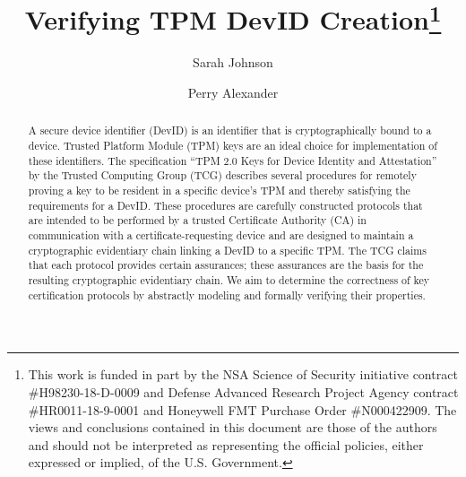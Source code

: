 \documentclass[runningheads]{llncs}
\begin{document}
%
\title{Verifying TPM DevID Creation\thanks{This work is funded in part
    by the NSA Science of Security initiative contract
    \#H98230-18-D-0009 and Defense Advanced Research Project Agency
    contract \#HR0011-18-9-0001 and Honeywell FMT Purchase Order
    \#N000422909. The views and conclusions contained in this document
    are those of the authors and should not be interpreted as
    representing the official policies, either expressed or implied,
    of the U.S. Government.}}
%
%
\author{Sarah Johnson \and
Perry Alexander}
%
%
%
\maketitle              %
%
\begin{abstract}
  A secure device identifier (DevID) is an identifier that is
  cryptographically bound to a device. Trusted Platform Module (TPM)
  keys are an ideal choice for implementation of these identifiers.
  The specification ``TPM 2.0 Keys for Device Identity and
  Attestation'' by the Trusted Computing Group (TCG) describes several
  procedures for remotely proving a key to be resident in a specific
  device's TPM and thereby satisfying the requirements for a
  DevID. These procedures are carefully constructed protocols that are
  intended to be performed by a trusted Certificate Authority (CA) in
  communication with a certificate-requesting device and are designed
  to maintain a cryptographic evidentiary chain linking a DevID to a
  specific TPM. The TCG claims that each protocol provides certain
  assurances; these assurances are the basis for the resulting
  cryptographic evidentiary chain.  We aim to determine the
  correctness of key certification protocols by abstractly modeling
  and formally verifying their properties.

\end{abstract}
%
%
%
\end{document}
